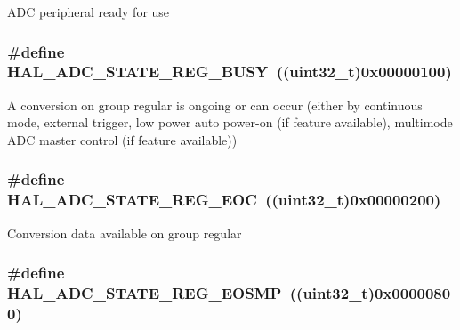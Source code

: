 A\-D\-C peripheral ready for use \hypertarget{group___a_d_c___exported___types_ga516d4b4ebc261c241c69d96aae19acc3}{
\subsubsection[{H\-A\-L\-\_\-\-A\-D\-C\-\_\-\-S\-T\-A\-T\-E\-\_\-\-R\-E\-G\-\_\-\-B\-U\-S\-Y}]{\setlength{\rightskip}{0pt plus 5cm}\#define H\-A\-L\-\_\-\-A\-D\-C\-\_\-\-S\-T\-A\-T\-E\-\_\-\-R\-E\-G\-\_\-\-B\-U\-S\-Y~((uint32\-\_\-t)0x00000100)}}\label{group___a_d_c___exported___types_ga516d4b4ebc261c241c69d96aae19acc3}
A conversion on group regular is ongoing or can occur (either by continuous mode, external trigger, low power auto power-\/on (if feature available), multimode A\-D\-C master control (if feature available)) \hypertarget{group___a_d_c___exported___types_gae2da191bffb720a553a1e39c10929711}{
\subsubsection[{H\-A\-L\-\_\-\-A\-D\-C\-\_\-\-S\-T\-A\-T\-E\-\_\-\-R\-E\-G\-\_\-\-E\-O\-C}]{\setlength{\rightskip}{0pt plus 5cm}\#define H\-A\-L\-\_\-\-A\-D\-C\-\_\-\-S\-T\-A\-T\-E\-\_\-\-R\-E\-G\-\_\-\-E\-O\-C~((uint32\-\_\-t)0x00000200)}}\label{group___a_d_c___exported___types_gae2da191bffb720a553a1e39c10929711}
Conversion data available on group regular \hypertarget{group___a_d_c___exported___types_ga28309e91f810694b13b5035f4ff698ce}{
\subsubsection[{H\-A\-L\-\_\-\-A\-D\-C\-\_\-\-S\-T\-A\-T\-E\-\_\-\-R\-E\-G\-\_\-\-E\-O\-S\-M\-P}]{\setlength{\rightskip}{0pt plus 5cm}\#define H\-A\-L\-\_\-\-A\-D\-C\-\_\-\-S\-T\-A\-T\-E\-\_\-\-R\-E\-G\-\_\-\-E\-O\-S\-M\-P~((uint32\-\_\-t)0x00000800)}}\label{group___a_d_c___exported___types_ga28309e91f810694b13b5035f4ff698ce}
